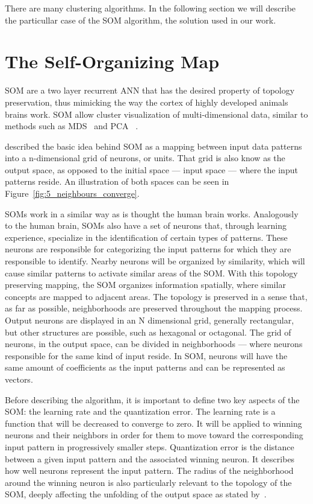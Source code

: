 There are many clustering algorithms. In the following section we will describe the particullar case of the \ac{SOM} algorithm, the solution used in our work.

\section{The Self-Organizing Map} 
\label{sec:the_self_organizing_map}

\ac{SOM} are a two layer recurrent \ac{ANN} that has the desired property of topology preservation, thus mimicking the way the cortex of highly developed animals brains work. \ac{SOM} allow cluster visualization of multi-dimensional data, similar to methods such as \ac{MDS}~\cite{KruskalWish1978} and \ac{PCA}~\cite{Hotelling_1933} .  

\citet{Bacao2005} described the basic idea behind \ac{SOM} as a mapping between input data patterns into a n-dimensional grid of neurons, or units. That grid is also know as the output space, as opposed to the initial space --- input space --- where the input patterns reside. An illustration of both spaces can be seen in Figure~\ref{fig:5_neighbours_converge}.

SOMs work in a similar way as is thought the human brain works. Analogously to the human brain, SOMs also have a set of neurons that, through learning experience, specialize in the identification of certain types of patterns. These neurons are responsible for categorizing the input patterns for which they are responsible to identify. Nearby neurons will be organized by similarity, which will cause similar patterns to activate similar areas of the \ac{SOM}.
With this topology preserving mapping, the \ac{SOM} organizes information spatially, where similar concepts are mapped to adjacent areas. The topology is preserved in a sense that, as far as possible, neighborhoods are preserved throughout the mapping process.
Output neurons are displayed in an N dimensional grid, generally rectangular, but other structures are possible, such as hexagonal or octagonal.  The grid of neurons, in the output space, can be divided in neighborhoods --- where neurons responsible for the same kind of input reside.
In \ac{SOM}, neurons will have the same amount of coefficients as the input patterns and can be represented as vectors.

Before describing the algorithm, it is important to define two key aspects of the \ac{SOM}: the learning rate and the quantization error. The learning rate is a function that will be decreased to converge to zero. It will be applied to winning neurons and their neighbors in order for them to move toward the corresponding input pattern in progressively smaller steps. Quantization error is the distance between a given input pattern and the associated winning neuron. It describes how well neurons represent the input pattern. The radius of the neighborhood around the winning neuron is also particularly relevant to the topology of the \ac{SOM}, deeply affecting the unfolding of the output space as stated by~\citet{Bacao2005}.
\par


